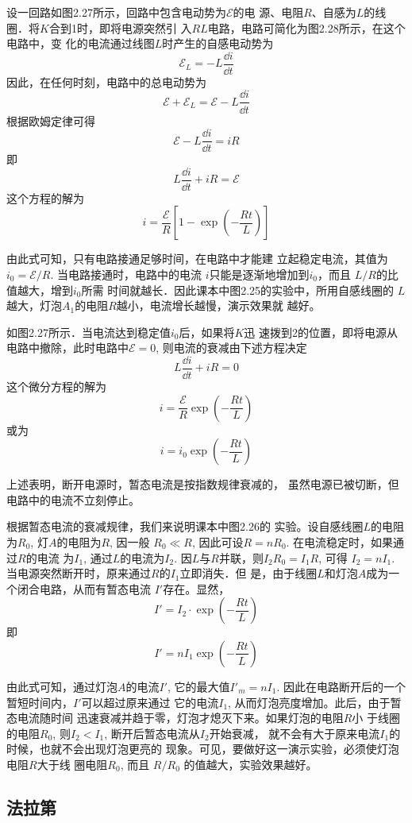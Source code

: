 设一回路如图2.27所示，回路中包含电动势为$\mathcal{E}$的电
源、电阻$R$、自感为$L$的线圈．将$K$合到1时，即将电源突然引
入$RL$电路，电路可简化为图2.28所示，在这个电路中，变
化的电流通过线图$L$时产生的自感电动势为
\[\mathcal{E}_L=-L\frac{\dd i}{\dd t}\]
因此，在任何时刻，电路中的总电动势为
\[\mathcal{E}+\mathcal{E}_L=\mathcal{E}-L\frac{\dd i}{\dd t}\]
根据欧姆定律可得
\[\mathcal{E}-L\frac{\dd i}{\dd t}=iR\]
即
\[L\frac{\dd i}{\dd t}+iR=\mathcal{E}\]
这个方程的解为
\[i= \frac{\mathcal{E}}{R}\left[1-\exp\left(-\frac{Rt}{L}\right)\right] \]

由此式可知，只有电路接通足够时间，在电路中才能建
立起稳定电流，其值为$i_0=\mathcal{E}/{R}$. 
当电路接通时，电路中的电流
$i$只能是逐渐地增加到$i_0$，而且
$L/R$的比值越大，增到$i_0$所需
时间就越长．因此课本中图2.25的实验中，所用自感线圈的
$L$越大，灯泡$A_1$的电阻$R$越小，电流增长越慢，演示效果就
越好。

如图2.27所示．当电流达到稳定值$i_0$后，如果将$K$迅
速拨到2的位置，即将电源从电路中撤除，此时电路中$\mathcal{E}=0$, 
则电流的衰减由下述方程决定
\[L\frac{\dd i}{\dd t}+iR=0\]
这个微分方程的解为
\[i=\frac{\mathcal{E}}{R}\exp\left(-\frac{Rt}{L}\right)\]
或为
\[i=i_0 \exp\left(-\frac{Rt}{L}\right)\]

上述表明，断开电源时，暂态电流是按指数规律衰减的，
虽然电源已被切断，但电路中的电流不立刻停止。

根据暂态电流的衰减规律，我们来说明课本中图2.26的
实验。设自感线圈$L$的电阻为$R_0$, 灯$A$的电阻为$R$, 因一般
$R_0\ll R$, 因此可设$R=nR_0$. 在电流稳定时，如果通过$R$的电流
为$I_1$, 通过$L$的电流为$I_2$. 因$L$与$R$并联，则$I_2R_0=I_1R$, 可得
$I_2=nI_1$. 当电源突然断开时，原来通过$R$的$I_1$立即消失．但
是，由于线圈$L$和灯泡$A$成为一个闭合电路，从而有暂态电流
$I'$存在。显然，
\[I'=I_2\cdot \exp\left(-\frac{Rt}{L}\right)\]
即
\[I'=nI_1 \exp\left(-\frac{Rt}{L}\right)\]

由此式可知，通过灯泡$A$的电流$I'$, 它的最大值$I'_{m}=nI_1$. 
因此在电路断开后的一个暂短时间内，$I'$可以超过原来通过
它的电流$I_1$, 从而灯泡亮度增加。此后，由于暂态电流随时间
迅速衰减并趋于零，灯泡才熄灭下来。如果灯泡的电阻$R$小
于线圈的电阻$R_0$, 则$I_2<I_1$, 断开后暂态电流从$I_2$开始衰减，
就不会有大于原来电流$I_1$的时候，也就不会出现灯泡更亮的
现象。可见，要做好这一演示实验，必须使灯泡电阻$R$大于线
圈电阻$R_0$, 而且
$R/R_0$
的值越大，实验效果越好。




\subsection{法拉第}

